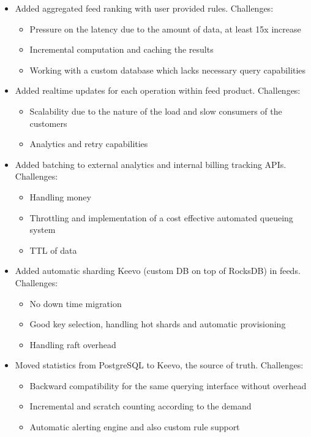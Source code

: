 \documentclass[line, margin]{res}
\begin{document}
\begin{resume}
\begin{itemize}
	\item{Added aggregated feed ranking with user provided rules. Challenges:}
		\begin{itemize} \itemsep -5pt \small
		\vspace{-.2cm}
		\item Pressure on the latency due to the amount of data, at least 15x increase
		\item Incremental computation and caching the results
		\item Working with a custom database which lacks necessary query capabilities
		\end{itemize}
		
	\item{Added realtime updates for each operation within feed product. Challenges:}
		\begin{itemize} \itemsep -5pt \small
		\vspace{-.2cm}
		\item Scalability due to the nature of the load and slow consumers of the customers
		\item Analytics and retry capabilities
		\end{itemize}
	
	\item{Added batching to external analytics and internal billing tracking APIs. Challenges:}
		\begin{itemize} \itemsep -5pt \small
		\vspace{-.2cm}
		\item Handling money
		\item Throttling and implementation of a cost effective automated queueing system
		\item TTL of data
		\end{itemize}
		
	\item{Added automatic sharding Keevo (custom DB on top of RocksDB) in feeds. Challenges:}
		\begin{itemize} \itemsep -5pt \small
		\vspace{-.2cm}
		\item No down time migration
		\item Good key selection, handling hot shards and automatic provisioning
		\item Handling raft overhead
		\end{itemize}
		
	\item{Moved statistics from PostgreSQL to Keevo, the source of truth. Challenges:}
		\begin{itemize} \itemsep -5pt \small
		\vspace{-.2cm}
		\item Backward compatibility for the same querying interface without overhead
		\item Incremental and scratch counting according to the demand
		\item Automatic alerting engine and also custom rule support
		\end{itemize}
\end{itemize}


\end{resume}
\end{document}
